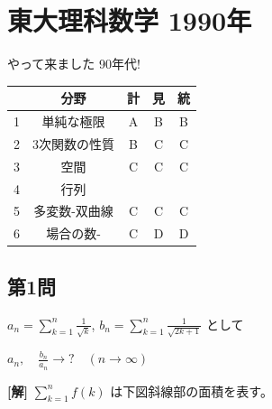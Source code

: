 \documentclass[../main.tex]{subfiles}
\begin{document}
\section*{東大理科数学 1990年}

やって来ました 90年代!

\begin{center}
  \begin{tabular}{|c|c|c|c|c|}
    \hline
    & 分野 & 計 & 見 & 統 \\ \hline
    1 & 単純な極限 & A & B & B \\ \hline
    2 & 3次関数の性質 & B & C & C \\ \hline
    3 & 空間 & C & C & C \\ \hline
    4 & 行列 & & & \\ \hline
    5 & 多変数-双曲線 & C & C & C \\ \hline
    6 & 場合の数- & C & D & D \\ \hline
  \end{tabular}
\end{center}

\newpage

\subsection*{第1問}

\begin{center}
  \begin{framed}
    $a_n = \displaystyle\sum_{k=1}^n \frac{1}{\sqrt{k}}$, $b_n = \displaystyle\sum_{k=1}^n \frac{1}{\sqrt{2k+1}}$ として

    $a_n, \quad \frac{b_n}{a_n} \to ? \quad (n \to \infty)$
  \end{framed}
\end{center}

\noindent
\textbf{[解]} $\sum_{k=1}^n f(k)$ は下図斜線部の面積を表す。
\end{document}
